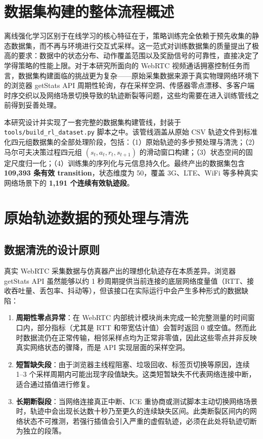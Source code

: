 \section{数据集构建的整体流程概述}

离线强化学习区别于在线学习的核心特征在于，策略训练完全依赖于预先收集的静态数据集，而不再与环境进行交互式采样。这一范式对训练数据集的质量提出了极高的要求：数据中的状态分布、动作覆盖范围以及奖励信号的可靠性，直接决定了学得策略的性能上限。对于本研究所面向的 WebRTC 视频通话拥塞控制任务而言，数据集构建面临的挑战更为复杂——原始采集数据来源于真实物理网络环境下的浏览器 getStats API 周期性轮询，存在采样空洞、传感器零点漂移、多客户端时序交织以及网络场景切换导致的轨迹断裂等问题，这些均需要在进入训练管线之前得到妥善处理。

本研究设计并实现了一套完整的数据集构建管线，封装于 \texttt{tools/build\_rl\_dataset.py} 脚本之中。该管线涵盖从原始 CSV 轨迹文件到标准化四元组数据集的全部处理阶段，包括：（1）原始轨迹的多步预处理与清洗；（2）马尔可夫决策过程四元组 $(s_t, a_t, r_t, s_{t+1})$ 的滑动窗口构建；（3）状态空间的固定尺度归一化；（4）训练集的序列化与元信息持久化。最终产出的数据集包含 \textbf{109,393 条有效 transition}，状态维度为 50，覆盖 3G、LTE、WiFi 等多种真实网络场景下的 \textbf{1,191 个连续有效轨迹段}。

\section{原始轨迹数据的预处理与清洗}

\subsection{数据清洗的设计原则}

真实 WebRTC 采集数据与仿真器产出的理想化轨迹存在本质差异。浏览器 getStats API 虽然能够以约 1 秒周期提供当前连接的底层网络度量值（RTT、接收吞吐量、丢包率、抖动等），但该接口在实际运行中会产生多种形式的数据缺陷：

\begin{enumerate}
    \item \textbf{周期性零点异常}：在 WebRTC 内部统计模块尚未完成一轮完整测量的时间窗口内，部分指标（尤其是 RTT 和带宽估计值）会暂时返回 0 或空值。然而此时数据流仍在正常传输，相邻采样点均为正常非零值，因此这些零点并非反映真实网络状态的骤降，而是 API 实现层面的采样空洞。
    \item \textbf{短暂缺失段}：由于浏览器主线程阻塞、垃圾回收、标签页切换等原因，连续 1–3 个采样周期内可能出现字段值缺失。这类短暂缺失不代表网络连接中断，适合通过插值进行修复。
    \item \textbf{长期断裂段}：当网络连接真正中断、ICE 重协商或测试脚本主动切换网络场景时，轨迹中会出现长达数十秒乃至更久的连续缺失区间。此类断裂区间内的网络状态不可推测，若强行插值会引入严重的虚假轨迹，必须在此处将轨迹切断为独立的段落。
\end{enumerate}

